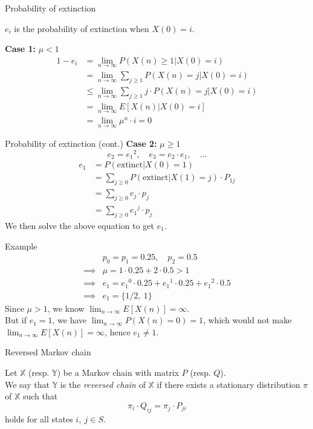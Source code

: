 \documentclass[mathserif]{beamer}
\begin{document}
\begin{frame}{Probability of extinction}
\begin{definition}
$e_i$ is the probability of extinction when $X(0) = i$.
\end{definition}
\textbf{Case 1:} $\mu < 1$
\begin{align*}
1 - e_i & = \lim_{n\to\infty} P(X(n) \geq 1 | X(0) = i) \\
& = \lim_{n\to\infty} \sum_{j \geq 1} P(X(n) = j|X(0) = i) \\
& \leq \lim_{n\to\infty} \sum_{j \geq 1} j \cdot P(X(n) = j|X(0) = i) \\
& = \lim_{n\to\infty} E[X(n)|X(0)=i] \\
& = \lim_{n\to\infty} \mu^n \cdot i = 0
\end{align*}
\end{frame}

\begin{frame}{Probability of extinction (cont.)}
\textbf{Case 2:} $\mu \geq 1$ 
\[
e_2 = {e_1}^2,\quad  e_3 = e_2 \cdot e_1,\quad\ldots
\]
\begin{align*}
e_1 & = P(\text{extinct}|X(0) = 1) \\
& = \sum_{j \geq 0} P(\text{extinct}|X(1) = j) \cdot P_{1j} \\
& = \sum_{j \geq 0} e_j \cdot p_j \\
& = \sum_{j \geq 0} {e_1}^j \cdot p_j
\end{align*}
We then solve the above equation to get $e_1$.
\end{frame}

\begin{frame}{Example}
\begin{align*}
& p_0 = p_1 = 0.25,\quad p_2 = 0.5 \\
\implies & \mu = 1 \cdot 0.25 + 2 \cdot 0.5 > 1 \\
\implies & e_1 = {e_1}^0 \cdot 0.25 + {e_1}^1 \cdot 0.25 + {e_1}^2 \cdot 0.5 \\
\implies & e_1 = \{1/2,~1\}
\end{align*}
Since $\mu > 1$, we know $\lim_{n\to\infty} E[X(n)] = \infty$.\\
But if $e_1 = 1$, we have $\lim_{n\to\infty} P(X(n) = 0) = 1$, which would not make $\lim_{n\to\infty} E[X(n)] = \infty$, hence $e_1 \neq 1$.
\end{frame}

\begin{frame}{Reversed Markov chain}
\begin{definition}
Let $\mathbb{X}$ (resp. $\mathbb{Y}$) be a Markov chain with matrix $P$ (resp. $Q$).\\
We say that $\mathbb{Y}$ is the \textit{reversed chain} of $\mathbb{X}$ if there exists a stationary distribution $\pi$ of $\mathbb{X}$ such that
\[
\pi_i \cdot Q_{ij} = \pi_j \cdot P_{ji}
\]
holds for all states $i,~ j \in S$.
\end{definition}
\end{frame}
\end{document}
